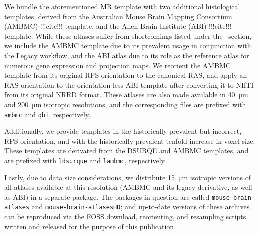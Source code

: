 We bundle the aforementioned MR template with two additional histological templates, derived from the Australian Mouse Brain Mapping Consortium (AMBMC) !!!cite!!! template, and the Allen Brain Institute (ABI) !!!cite!!! template.
While these atlases suffer from shortcomings listed under the ~section, we include the AMBMC template due to its prevalent usage in conjunction with the Legacy workflow, and the ABI atlas due to its role as the reference atlas for numerous gene expression and projection maps.
We reorient the AMBMC template from its original RPS orientation to the canonical RAS, and apply an RAS orientation to the orientation-less ABI template after converting it to NIfTI from its original NRRD format.
These atlases are also made available in \SI{40}{\micro\meter} and \SI{200}{\micro\meter} isotropic resolutions, and the corresponding files are prefixed with \textcolor{mg}{\texttt{ambmc}} and \textcolor{mg}{\texttt{qbi}}, respectively.

Additionally, we provide templates in the historically prevalent but incorrect, RPS orientation, and with the historically prevalent tenfold increase in voxel size.
These templates are derivated from the DSURQE and AMBMC templates, and are prefixed with \textcolor{mg}{\texttt{ldsurque}} and \textcolor{mg}{\texttt{lambmc}}, respectively.

Lastly, due to data size considerations, we distribute \SI{15}{\micro\meter} isotropic versions of all atlases available at this resolution (AMBMC and its legacy derivative, as well as ABI) in a separate package.
The packages in question are called \textcolor{mg}{\texttt{mouse-brain-atlases}} and \textcolor{mg}{\texttt{mouse-brain-atlasesHD}};
and up-to-date versions of these archives can be reproduced via the FOSS download, reorienting, and resampling scripts, written and released for the purpose of this publication.  

